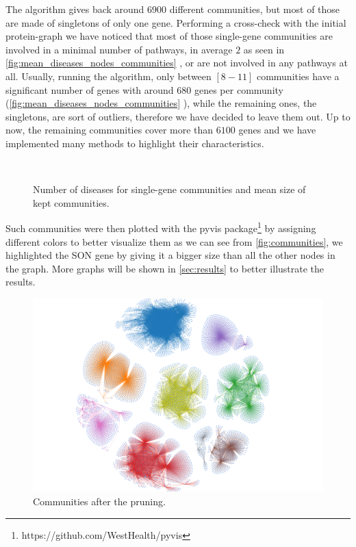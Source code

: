 The algorithm gives back around $6900$ different communities, but most of those are made of singletons of only one gene. Performing a cross-check with the initial protein-graph we have noticed that most of those single-gene communities are involved in a minimal number of pathways, in average $2$ as seen in \autoref{fig:mean_diseases_nodes_communities} , or are not involved in any pathways at all. Usually, running the algorithm, only between $[8-11]$ communities have a significant number of genes with around $680$ genes per community (\autoref{fig:mean_diseases_nodes_communities} ), while the remaining ones, the singletons, are sort of outliers, therefore we have decided to leave them out. Up to now, the remaining communities cover more than $6100$ genes and we have implemented many methods to highlight their characteristics.
\begin{figure}[H]
    \centering
    \\
    \caption{Number of diseases for single-gene communities and mean size of kept communities.}
    \label{fig:mean_diseases_nodes_communities}
\end{figure}
Such communities were then plotted with the pyvis package\footnote{https://github.com/WestHealth/pyvis} by assigning different colors to better visualize them as we can see from \autoref{fig:communities}, we highlighted the SON gene by giving it a bigger size than all the other nodes in the graph. More graphs will be shown in \autoref{sec:results} to better illustrate the results.
\begin{figure}[H]
    \centering
    \includegraphics[width=0.9\linewidth]{images/plots/communities.png}
    \caption{Communities after the pruning.}
    \label{fig:communities}
\end{figure}

